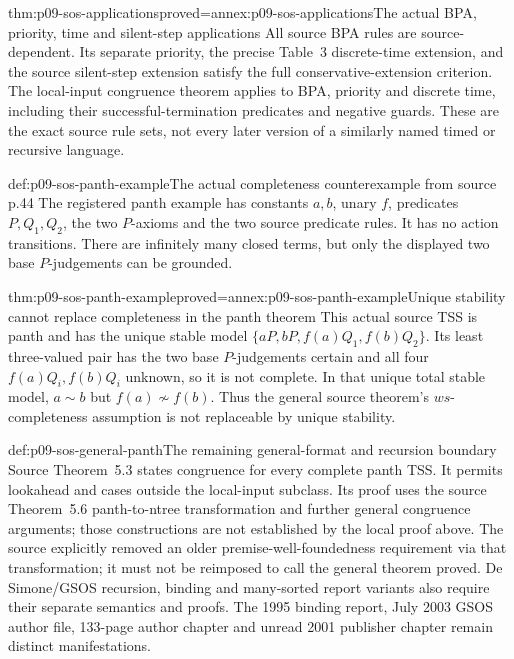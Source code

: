 \begin{hbtheorem}{thm:p09-sos-applications}{proved=annex:p09-sos-applications}{The actual BPA, priority, time and silent-step applications}
All source BPA rules are source-dependent. Its separate priority,
the precise Table~3 discrete-time extension, and the source silent-step
extension satisfy the full conservative-extension criterion. The
local-input congruence theorem applies to BPA, priority and discrete
time, including their successful-termination predicates and negative
guards. These are the exact source rule sets, not every later version
of a similarly named timed or recursive language.
\end{hbtheorem}

\begin{hbdefinition}{def:p09-sos-panth-example}{The actual completeness counterexample from source p.44}
The registered panth example has constants \(a,b\), unary \(f\),
predicates \(P,Q_1,Q_2\), the two \(P\)-axioms and the two
source predicate rules. It has no action transitions. There are
infinitely many closed terms, but only the displayed two base
\(P\)-judgements can be grounded.
\end{hbdefinition}

\begin{hbtheorem}{thm:p09-sos-panth-example}{proved=annex:p09-sos-panth-example}{Unique stability cannot replace completeness in the panth theorem}
This actual source TSS is panth and has the unique stable model
\(\{aP,bP,f(a)Q_1,f(b)Q_2\}\). Its least three-valued pair
has the two base \(P\)-judgements certain and all four
\(f(a)Q_i,f(b)Q_i\) unknown, so it is not complete.
In that unique total stable model, \(a\sim b\) but
\(f(a)\not\sim f(b)\). Thus the general source theorem's
\(ws\)-completeness assumption is not replaceable by unique stability.
\end{hbtheorem}

\begin{proofboundary}{def:p09-sos-general-panth}{The remaining general-format and recursion boundary}
Source Theorem~5.3 states congruence for every complete panth TSS.
It permits lookahead and cases outside the local-input subclass.
Its proof uses the source Theorem~5.6 panth-to-ntree transformation
and further general congruence arguments; those constructions are
not established by the local proof above. The source explicitly
removed an older premise-well-foundedness requirement via that
transformation; it must not be reimposed to call the general theorem
proved. De Simone/GSOS recursion, binding and many-sorted report
variants also require their separate semantics and proofs. The
1995 binding report, July 2003 GSOS author file, 133-page author
chapter and unread 2001 publisher chapter remain distinct manifestations.
\end{proofboundary}
